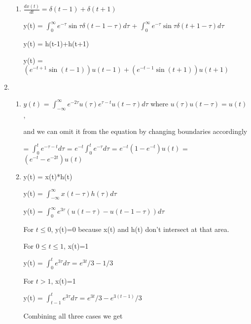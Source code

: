 \documentclass[10pt,a4paper, margin=1in]{article}
\begin{document}
\begin{enumerate}
\begin{enumerate}
    \item %
    $\frac{dx(t)}{dt}=\delta(t-1)+\delta(t+1)$
    
    y(t) = $\int_{0}^{\infty}e^{-\tau}\sin{\tau}\delta(t-1-\tau)d\tau$ + $\int_{0}^{\infty}e^{-\tau}\sin{\tau}\delta(t+1-\tau)d\tau$
    
    y(t) = h(t-1)+h(t+1)
    
    y(t) = $(e^{-t+1}\sin{(t-1)})u(t-1)+(e^{-t-1}\sin(t+1))u(t+1)$
    
    \end{enumerate}

\item %
    \begin{enumerate}
    \item %
    $y(t)$ = $\int_{-\infty}^{\infty}e^{-2\tau}u(\tau)e^{\tau-t}u(t-\tau)d\tau$
    where $u(\tau)u(t-\tau)=u(t)$,
    \vspace{0.25cm}
    
    and we can omit it from the equation by changing boundaries accordingly
    \vspace{0.25cm}
    
    = $\int_{0}^{t} e^{-\tau-t}d\tau$
    = $e^{-t}\int_{0}^{t} e^{-\tau}d\tau$
    = $e^{-t}(1-e^{-t})u(t)$
    = $(e^{-t}-e^{-2t})u(t)$
    \item %
    
    y(t) = x(t)*h(t)
    
    y(t) = $\int_{-\infty}^{\infty}x(t-\tau)h(\tau)d\tau$
    
    y(t) = $\int_{0}^{\infty}e^{3\tau}(u(t-\tau)-u(t-1-\tau))d\tau$
    \vspace{0.25cm}
    
    For $t\leq 0$, y(t)=0 because x(t) and h(t) don't intersect at that area.
    \vspace{0.25cm}
    
    For $0 \leq t \leq 1$, x(t)=1
    
    y(t) = $\int_{0}^{t}e^{3\tau}d\tau$ = $e^{3t}/3 - 1/3$
    \vspace{0.25cm}
    
    For $t > 1$, x(t)=1
    
    y(t) = $\int_{t-1}^{t}e^{3\tau}d\tau$ = $e^{3t}/3 - e^{3(t-1)}/3$
    \vspace{0.25cm}

    Combining all three cases we get
    

\end{enumerate}
\end{enumerate}
\end{document}
